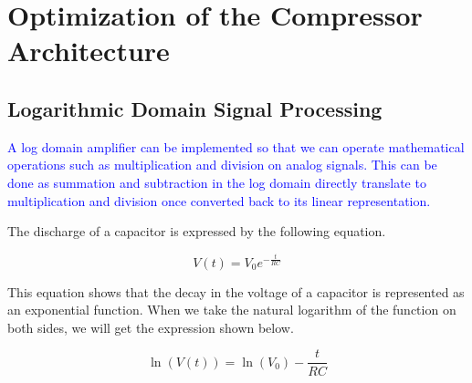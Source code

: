 \documentclass[10pt]{article}
\begin{document}
\begin{multicols*}{2}
\begin{minipage}{\linewidth}
                    
                    \label{fig:feedforward}
                
                \end{minipage}
        
        \section{Optimization of the Compressor Architecture}
            
            \subsection{Logarithmic Domain Signal Processing}
                \textcolor{blue}{A log domain amplifier can be implemented so that we can operate mathematical operations such as multiplication and division on analog signals. This can be done as summation and subtraction in the log domain directly translate to multiplication and division once converted back to its linear representation.}

                The discharge of a capacitor is expressed by the following equation.              
                
                \begin{equation}
                    V(t) = V_0 e^{-\frac{t}{RC}}
                \end{equation}    
                
                This equation shows that the decay in the voltage of a capacitor is represented as an exponential function.
                When we take the natural logarithm of the function on both sides, we will get the expression shown below.
                
                \begin{equation}
                    \ln(V(t)) = \ln(V_0) - \frac{t}{RC}
                \end{equation}
                

\end{multicols*}
\end{document}
